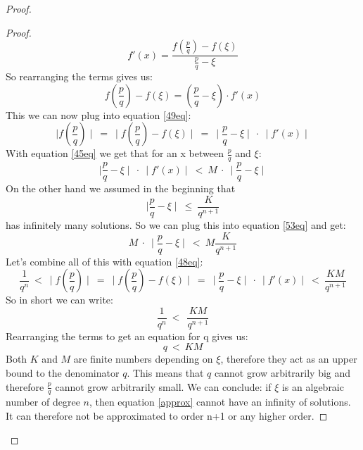 \documentclass{article}
\theoremstyle{definition}
\begin{document}
\begin{proof}
\begin{proof}
    \begin{equation}
       f'(x) = \frac{f(\frac{p}{q})-f(\xi)}{\frac{p}{q}-\xi} 
    \end{equation}
    So rearranging the terms gives us:
    \begin{equation}
        f(\frac{p}{q})-f(\xi) = (\frac{p}{q}-\xi)\cdot f'(x) 
    \end{equation}
    This we can now plug into equation \ref{49eq}:
    \begin{equation}
     \mid   f(\frac{p}{q})\mid \:  = \: \mid   f(\frac{p}{q})-f(\xi) \mid \: = \: \mid \frac{p}{q}-\xi \mid \: \cdot \: \mid f'(x) \mid 
    \end{equation}
With equation \ref{45eq} we get that for an x between $\frac{p}{q}$ and $\xi$:
\begin{equation}
\label{53eq}
     \mid \frac{p}{q}-\xi \mid \: \cdot \: \mid f'(x) \mid \: < \:  M \: \cdot \: \mid \frac{p}{q}-\xi \mid
\end{equation}
On the other hand we assumed in the beginning that 
    \begin{equation}
    \mid \frac{p}{q}-\xi\mid \: \leq \:  \frac{K}{q^{n+1}}
\end{equation}
has infinitely many solutions. So we can plug this into equation \ref{53eq} and get:
\begin{equation}
     M \: \cdot \: \mid \frac{p}{q}-\xi \mid \: < \: M\frac{K}{q^{n+1}}
\end{equation} 
Let's combine all of this with equation \ref{48eq}:
\begin{equation}
    \frac{1}{q^n} \: < \:  \mid f(\frac{p}{q}) \mid \: = \: \mid   f(\frac{p}{q})-f(\xi) \mid \: = \:  \mid \frac{p}{q}-\xi \mid \: \cdot \: \mid f'(x) \mid \: < \: \frac{KM}{q^{n+1}} 
\end{equation}
So in short we can write:
\begin{equation}
    \frac{1}{q^n} \: < \: \: \frac{KM}{q^{n+1}} 
\end{equation}
Rearranging the terms to get an equation for q gives us:
\begin{equation}
    q \: < \: KM
\end{equation}
Both $K$ and $M$ are finite numbers depending on $\xi$, therefore they act as an upper bound to the denominator $q$. This means that $q$ cannot grow arbitrarily big and therefore $\frac{p}{q}$ cannot grow arbitrarily small. We can conclude: if $\xi$ is an algebraic number of degree $n$, then equation \ref{approx} cannot have an infinity of solutions. It can therefore not be approximated to order n+1 or any higher order.
\end{proof}


\end{proof}
\end{document}
